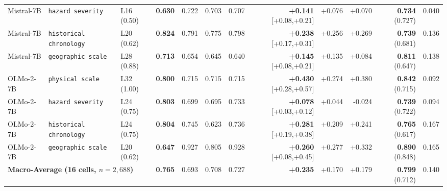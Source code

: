 \documentclass[10pt,twocolumn]{article}
\begin{document}
\begin{table}[t]
{\begin{tabular}{lllrrrrrrrrr}
    Mistral-7B & \texttt{hazard severity} & L16 (0.50) & \textbf{0.630} & 0.722 & 0.703 & 0.707 & \textbf{+0.141} [+0.08,+0.21] & +0.076 & +0.070 & \textbf{0.734} (0.727) & 0.040 \\
    Mistral-7B & \texttt{historical chronology} & L20 (0.62) & \textbf{0.824} & 0.791 & 0.775 & 0.798 & \textbf{+0.238} [+0.17,+0.31] & +0.256 & +0.269 & \textbf{0.739} (0.681) & 0.136 \\
    Mistral-7B & \texttt{geographic scale} & L28 (0.88) & \textbf{0.713} & 0.654 & 0.645 & 0.640 & \textbf{+0.145} [+0.08,+0.21] & +0.135 & +0.084 & \textbf{0.811} (0.647) & 0.138 \\
    \midrule
    OLMo-2-7B & \texttt{physical scale} & L32 (1.00) & \textbf{0.800} & 0.715 & 0.715 & 0.715 & \textbf{+0.430} [+0.28,+0.57] & +0.274 & +0.380 & \textbf{0.842} (0.715) & 0.092 \\
    OLMo-2-7B & \texttt{hazard severity} & L24 (0.75) & \textbf{0.803} & 0.699 & 0.695 & 0.733 & \textbf{+0.078} [+0.03,+0.12] & +0.044 & -0.024 & \textbf{0.739} (0.722) & 0.094 \\
    OLMo-2-7B & \texttt{historical chronology} & L24 (0.75) & \textbf{0.804} & 0.745 & 0.623 & 0.736 & \textbf{+0.281} [+0.19,+0.38] & +0.209 & +0.241 & \textbf{0.765} (0.617) & 0.167 \\
    OLMo-2-7B & \texttt{geographic scale} & L20 (0.62) & \textbf{0.647} & 0.927 & 0.805 & 0.928 & \textbf{+0.260} [+0.08,+0.45] & +0.277 & +0.332 & \textbf{0.890} (0.848) & 0.165 \\
    \midrule
    \multicolumn{3}{l}{\textbf{Macro-Average (16 cells, $n=2,688$)}} & \textbf{0.765} & 0.693 & 0.708 & 0.727 & \textbf{+0.235} & +0.170 & +0.179 & \textbf{0.799} (0.712) & 0.140 \\
    \bottomrule
  \end{tabular}}
\end{table}

\begin{table}[t]
  \centering
  \caption{Mid-depth ablation across all four models: ACE subspace rank ($1, 2, 4$) and Tuned Lens ridge regularization ($\alpha \in \{10, 100, 1000\}$).}
  \label{tab:steer_ablation}
  \scriptsize
\end{table}
\end{document}
